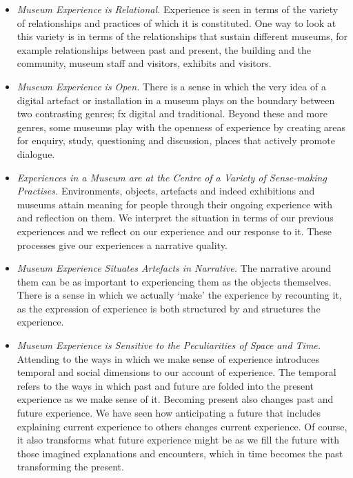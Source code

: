 \begin{itemize}
    \item \emph{Museum Experience is Relational.} Experience is seen in terms of the variety of relationships and practices of which it is constituted. One way to look at this variety is in terms of the relationships that sustain different museums, for example relationships between past and present, the building and the community, museum staff and visitors, exhibits and visitors. 
    
    \item \emph{Museum Experience is Open.} There is a sense in which the very idea of a digital artefact or installation in a museum plays on the boundary between two contrasting genres; fx digital and traditional. Beyond these and more genres, some museums play with the openness of experience by creating areas for enquiry, study, questioning and discussion, places that actively promote dialogue.

    \item \emph{Experiences in a Museum are at the Centre of a Variety of Sense-making Practises.} Environments, objects, artefacts and indeed exhibitions and museums attain meaning for people through their ongoing experience with and reflection on them. We interpret the situation in terms of our previous experiences and we reflect on our experience and our response to it. These processes give our experiences a narrative quality.
    
    \item \emph{Museum Experience Situates Artefacts in Narrative.} The narrative around them can be as important to experiencing them as the objects themselves. There is a sense in which we actually ‘make’ the experience by recounting it, as the expression of experience is both structured by and structures the experience. 
    
    \item \emph{Museum Experience is Sensitive to the Peculiarities of Space and Time.} Attending to the ways in which we make sense of experience introduces temporal and social dimensions to our account of experience. The temporal refers to the ways in which past and future are folded into the present experience as we make sense of it. Becoming present also changes past and future experience. We have seen how anticipating a future that includes explaining current experience to others changes current experience. Of course, it also transforms what future experience might be as we fill the future with those imagined explanations and encounters, which in time becomes the past transforming the present. 

\end{itemize}


